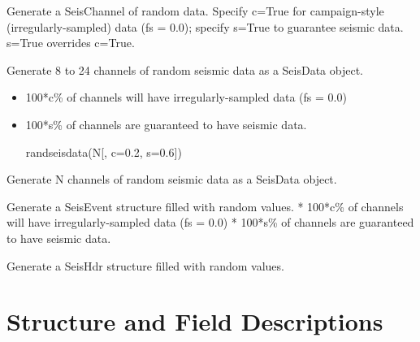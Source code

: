 \documentclass[letterpaper,11pt,english]{sphinxmanual}
\begin{document}
\begin{fulllineitems}
\end{fulllineitems}


Generate a SeisChannel of random data. Specify c=True for campaign-style (irregularly-sampled) data (fs = 0.0); specify s=True to guarantee seismic data. s=True overrides c=True.

Generate 8 to 24 channels of random seismic data as a SeisData object.
\begin{itemize}
\item {} 
100*c\% of channels  will have irregularly-sampled data (fs = 0.0)

\item {} 
100*s\% of channels  are guaranteed to have seismic data.

randseisdata(N{[}, c=0.2, s=0.6{]})

\end{itemize}

Generate N channels of random seismic data as a SeisData object.

\begin{fulllineitems}
\label{\detokenize{src/Appendices/function_list:randseisevent}}
\end{fulllineitems}


Generate a SeisEvent structure filled with random values.
* 100*c\% of channels  will have irregularly-sampled data (fs = 0.0)
* 100*s\% of channels  are guaranteed to have seismic data.


\begin{fulllineitems}
\end{fulllineitems}


Generate a SeisHdr structure filled with random values.


\section{Structure and Field Descriptions}
\label{\detokenize{src/Appendices/seisdata_fields:structure-and-field-descriptions}}\label{\detokenize{src/Appendices/seisdata_fields::doc}}
\end{document}
